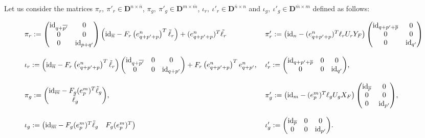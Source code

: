 \documentclass[10pt]{article}
\newenvironment{changemargin}[2]{\begin{list}{}{%
      \setlength{\topsep}{0pt}%
      \setlength{\leftmargin}{0pt}%
      \setlength{\rightmargin}{0pt}%
      \setlength{\listparindent}{\parindent}%
      \setlength{\itemindent}{\parindent}%
      \setlength{\parsep}{0pt plus 1pt}%
      \addtolength{\leftmargin}{#1}%
      \addtolength{\rightmargin}{#2}%
    }\item }{\end{list}}
\newcommand\g[1]{\textbf{#1}}
\newcommand\id[1]{\text{id}_{#1}}
\newcommand\D{\g{D}}
\begin{document}
Let us consider the matrices $\pi_r,\ \pi'_r\in\D^{n\times\overline{n}}$,
$\pi_g,\ \pi'_g\in\D^{m\times\overline{m}}$, $\iota_r,\ \iota'_r\in\D^{
  \overline{n}\times n}$ and $\iota_g,\ \iota'_g\in\D^{\overline{m}\times
  m}$ defined as follows:
\begin{changemargin}{-1.5cm}{0cm}
  \[\begin{tabular}{l l}
  $\pi_r:=\begin{pmatrix}
  \id{q+\overline{p'}} & 0\\
  0 & 0\\
  0 & \id{p+q'}
  \end{pmatrix}\left(\id{\overline{n}}-F_r\left(e^n_{q+p'+p}\right)^T
  \tilde{\ell}_r\right)+(e^n_{q+p'+p})^T\tilde{\ell_r}$
  &
  $\pi'_r:=\left(\id{n}-(e^{n}_{q+p'+p})^T\ell_rU_rY_F\right)\begin{pmatrix}
    \id{q+p'+\overline{p}} & 0\\
    0 & 0\\
    0 & \id{q'}
  \end{pmatrix}$ \\
  &
  \\
  $\iota_r:=\left(\id{\overline{n}}-F_r\left(e^n_{q+p'+p}\right)^T\tilde{
    \ell}_r\right)
  \begin{pmatrix}
    \id{q+\overline{p'}} & 0 & 0\\
    0 & 0 & \id{q+p'}
  \end{pmatrix}+F_r\left(e^n_{q+p'+p}\right)^Te^n_{q+p'}$,
  &
  $\iota'_r:=\begin{pmatrix}
  \id{q+p'+\overline{p}} & 0 & 0\\
  0 & 0 & \id{q'}
  \end{pmatrix}$,
  \\
  & \\
  $\pi_g:=\begin{pmatrix}
  \id{\overline{m}}-F_g(e^m_p)^T\tilde{\ell}_g\\
  \tilde{\ell}_g
  \end{pmatrix}$,
  &
  $\pi'_g:=\begin{pmatrix}
  \id{m}-(e^m_p)^T\ell_gU_gX_F
  \end{pmatrix}\begin{pmatrix}
    \id{\overline{p}} & 0\\
    0 & 0\\
    0 & \id{p'}
  \end{pmatrix}$,
  \\
  & \\
  $\iota_g:=\begin{pmatrix}
  \id{\overline{m}}-F_g(e^m_{p})^T\tilde{\ell}_g & F_g(e^m_{p})^T
  \end{pmatrix}$
  &
  $\iota'_g:=\begin{pmatrix}
  \id{\overline{p}} & 0 & 0\\
  0 & 0 & \id{p'}
  \end{pmatrix}$.
  \end{tabular}\]
\end{changemargin}
\end{document}
